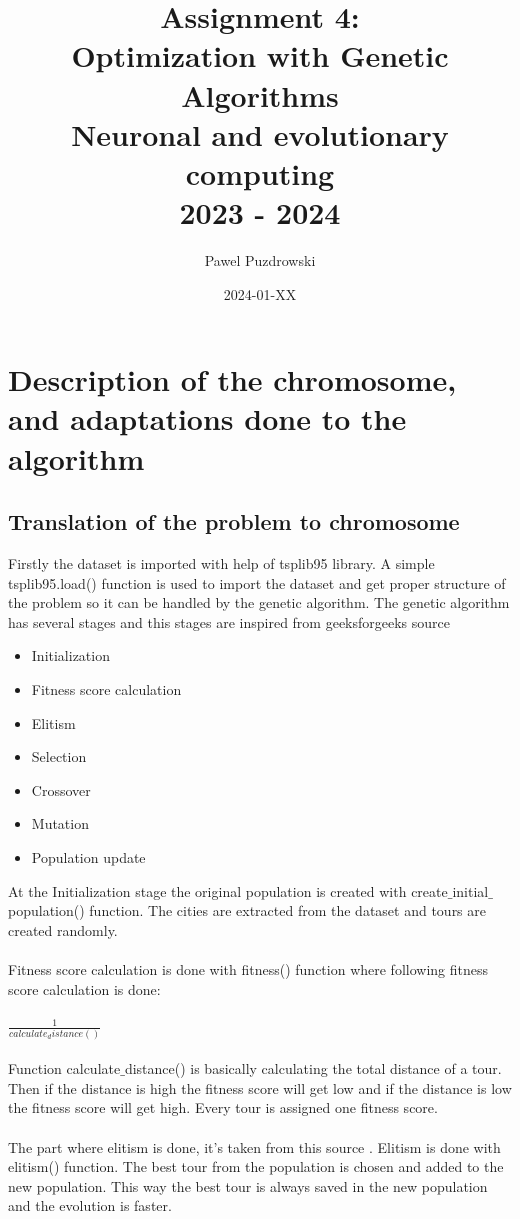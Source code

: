 \documentclass[12pt]{report}
\title{Assignment 4: \\ Optimization with Genetic Algorithms \\ Neuronal and evolutionary computing\\ 2023 - 2024}
\author{Pawel Puzdrowski}
\date{2024-01-XX}
\begin{document}
    \maketitle
    \tableofcontents
    \newpage
    \section{Description of the chromosome, and adaptations done to the algorithm}
    \subsection{Translation of the problem to chromosome}
    Firstly the dataset is imported with help of tsplib95 library. A simple tsplib95.load() function is used to import the dataset and get proper structure of the problem so it can be handled by the genetic algorithm. The genetic algorithm has several stages and this stages are inspired from geeksforgeeks source \cite{TSPGeeksforgeeks}
    \begin{itemize}
        \item Initialization 
        \item Fitness score calculation
        \item Elitism 
        \item Selection 
        \item Crossover 
        \item Mutation 
        \item Population update 
    \end{itemize}
    At the Initialization stage the original population is created with create$\_$initial$\_$population() function. The cities are extracted from the dataset and tours are created randomly. \\
    \\
    Fitness score calculation is done with fitness() function where following fitness score calculation is done:\\
    \\
    $\frac{1}{calculate_distance()}$\\
    \\
    Function calculate$\_$distance() is basically calculating the total distance of a tour. Then if the distance is high the fitness score will get low and if the distance is low the fitness score will get high. Every tour is assigned one fitness score. \\
    \\
    The part where elitism is done, it's taken from this source \cite{Elitismsource}. Elitism is done with elitism() function. The best tour from the population is chosen and added to the new population. This way the best tour is always saved in the new population and the evolution is faster.\\
\end{document}
